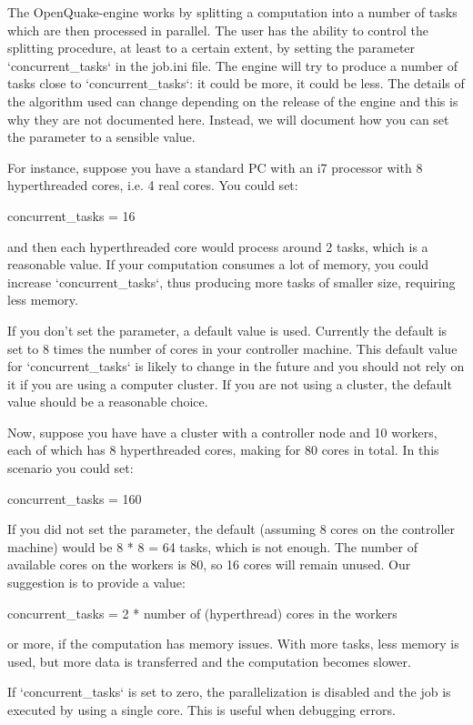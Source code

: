 The OpenQuake-engine works by splitting a computation into a number of tasks
which are then processed in parallel. The user has the ability to
control the splitting procedure, at least to a certain extent, by
setting the parameter `concurrent\_tasks` in the job.ini file. The
engine will try to produce a number of tasks close to
`concurrent\_tasks`: it could be more, it could be less. The details
of the algorithm used can change depending on the release of the engine and
this is why they are not documented here. Instead, we will document
how you can set the parameter to a sensible value.

For instance, suppose you have a standard PC with an i7 processor with
8 hyperthreaded cores, i.e. 4 real cores.  You could set:

concurrent\_tasks = 16

and then each hyperthreaded core would process around 2 tasks, which
is a reasonable value. If your computation consumes a lot of memory,
you could increase `concurrent\_tasks`, thus producing more tasks
of smaller size, requiring less memory.

If you don't set the parameter, a default value is used. Currently the
default is set to 8 times the number of cores in your controller machine.
This default value for `concurrent\_tasks` is likely to change in the future and you should not rely on it if you are using a computer cluster. If you are not using a cluster, the default value should be a reasonable choice.

Now, suppose you have have a cluster with a controller node and 10 workers, each
of which has 8 hyperthreaded cores, making for 80 cores in total. In this scenario you could set:

concurrent\_tasks = 160

If you did not set the parameter, the default (assuming 8 cores on the
controller machine) would be 8 * 8 = 64 tasks, which is
not enough. The number of available cores on the workers is 80, so 16 cores
will remain unused. Our suggestion is to provide a value:

concurrent\_tasks = 2 * number of (hyperthread) cores in the workers

or more, if the computation has memory issues. With more tasks, less
memory is used, but more data is transferred and the computation
becomes slower.

If `concurrent\_tasks` is set to zero, the parallelization
is disabled and the job is executed by using a single core. This
is useful when debugging errors.